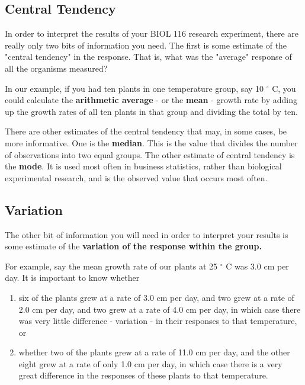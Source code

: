 \documentclass[
]{book}
\begin{document}
\hypertarget{central-tendency}{%
\subsection*{Central Tendency}\label{central-tendency}}

In order to interpret the results of your BIOL 116 research experiment, there are really only two bits of information you need. The first is some estimate of the "central tendency" in the response. That is, what was the "average" response of all the organisms measured?

In our example, if you had ten plants in one temperature group, say 10 \(^\circ\) C, you could calculate the \textbf{arithmetic average} - or the \textbf{mean} - growth rate by adding up the growth rates of all ten plants in that group and dividing the total by ten.

There are other estimates of the central tendency that may, in some cases, be more informative. One is the \textbf{median}. This is the value that divides the number of observations into two equal groups. The other estimate of central tendency is the \textbf{mode}. It is used most often in business statistics, rather than biological experimental research, and is the observed value that occurs most often.

\hypertarget{variation}{%
\subsection*{Variation}\label{variation}}

The other bit of information you will need in order to interpret your results is some estimate of the \textbf{variation of the response within the group.}

For example, say the mean growth rate of our plants at 25 \(^\circ\) C was 3.0 cm per day. It is important to know whether

\begin{enumerate}
\def\labelenumi{\alph{enumi})}
\item
  six of the plants grew at a rate of 3.0 cm per day, and two grew at a rate of 2.0 cm per day, and two grew at a rate of 4.0 cm per day, in which case there was very little difference - variation - in their responses to that temperature, or
\item
  whether two of the plants grew at a rate of 11.0 cm per day, and the other eight grew at a rate of only 1.0 cm per day, in which case there is a very great difference in the responses of these plants to that temperature.
\end{enumerate}
\end{document}

